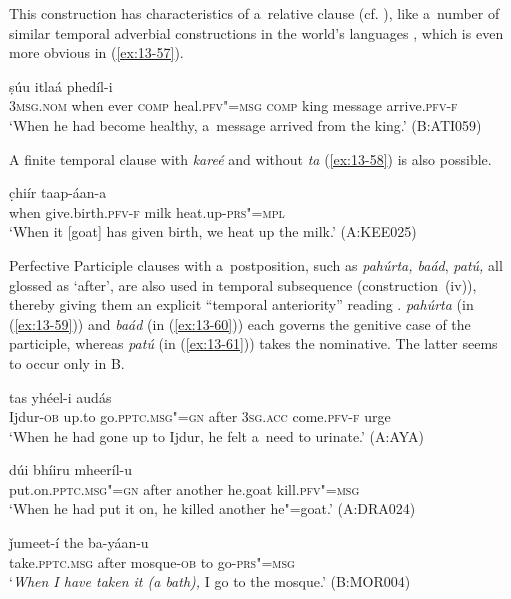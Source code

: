 This construction has characteristics of a~relative clause (cf. ), like a~number of similar temporal adverbial constructions in the world's languages \citep[246--247]{thompsonetal2007}, which is even more obvious in (\ref{ex:13-57}).

\begin{exe}
\ex
\label{ex:13-57}
 ṣúu itlaá phedíl-i \\
\textsc{3msg.nom} when ever \textsc{comp} heal.\textsc{pfv"=msg} \textsc{comp} king message arrive.\textsc{pfv-f} \\
\glt `When he had become healthy, a~message arrived from the king.' (B:ATI059) 
\end{exe}

A finite temporal clause with \textit{kareé} and without \textit{ta} (\ref{ex:13-58}) is also possible.

\begin{exe}
\ex
\label{ex:13-58}
 c̣hiír taap-áan-a \\
when give.birth.\textsc{pfv-f} milk heat.up-\textsc{prs"=mpl} \\
\glt `When it [goat] has given birth, we heat up the milk.' (A:KEE025) 
\end{exe}

Perfective Participle clauses with a~postposition, such as \textit{pahúrta, baád}, \textit{patú,} all glossed as `after', are also used in temporal subsequence (construction~(iv)), thereby giving them an explicit ``temporal anteriority'' reading \citep[159]{cristofaro2005}. \textit{pahúrta} (in (\ref{ex:13-59})) and \textit{baád} (in (\ref{ex:13-60})) each governs the genitive case of the participle, whereas \textit{patú} (in (\ref{ex:13-61})) takes the nominative. The latter seems to occur only in B. 

\begin{exe}
\ex
\label{ex:13-59}
\gll [iẓḍúur-a ǰe ɡúum"=ii pahúrta] tas yhéel-i audás \\
Ijdur-\textsc{ob} up.to go.\textsc{pptc.msg"=gn} after \textsc{3sg.acc} come.\textsc{pfv-f} urge \\
\glt `When he had gone up to Ijdur, he felt a~need to urinate.' (A:AYA)

\ex
\label{ex:13-60}
\gll [ṣaawóol"=ii baád] dúi bhíiru mheeríl-u \\
put.on.\textsc{pptc.msg"=gn} after another he.goat kill.\textsc{pfv"=msg}  \\
\glt `When he had put it on, he killed another he"=goat.' (A:DRA024)

\ex
\label{ex:13-61}
 ǰumeet-í the ba-yáan-u  \\
take.\textsc{pptc.msg} after mosque-\textsc{ob} to go-\textsc{prs"=msg} \\
\glt `\textit{When I have taken it (a bath),} I go to the mosque.' (B:MOR004) 
\end{exe}

